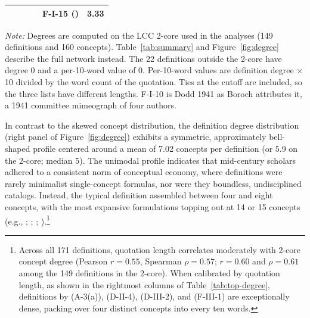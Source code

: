 \documentclass[11pt]{article}
\begin{document}
\begin{table}[t]
\begin{tabular}{lrlrlr}
 & & & & F-I-15 (\citealt{carr1945}) & 3.33 \\
\bottomrule
\end{tabular}
\par\smallskip
\begin{minipage}{0.95\linewidth}
\small
\emph{Note:} Degrees are computed on the LCC 2-core used in the analyses (149 definitions and 160 concepts). Table~\ref{tab:summary} and Figure~\ref{fig:degree} describe the full network instead. The 22 definitions outside the 2-core have degree 0 and a per-10-word value of 0. Per-10-word values are definition degree $\times$ 10 divided by the word count of the quotation. Ties at the cutoff are included, so the three lists have different lengths. F-I-10 is Dodd 1941 as Boroch attributes it, a 1941 committee mimeograph of four authors.
\end{minipage}
\end{table}

In contrast to the skewed concept distribution, the definition degree distribution (right panel of Figure~\ref{fig:degree}) exhibits a symmetric, approximately bell-shaped profile centered around a mean of 7.02 concepts per definition (or 5.9 on the 2-core; median 5). The unimodal profile indicates that mid-century scholars adhered to a consistent norm of conceptual economy, where definitions were rarely minimalist single-concept formulas, nor were they boundless, undisciplined catalogs. Instead, the typical definition assembled between four and eight concepts, with the most expansive formulations topping out at 14 or 15 concepts (e.g., \citealt{reuter1939}; \citealt{taylor1948}; \citealt{hiller1933}; \citealt{gillin1942}).\footnote{Across all 171 definitions, quotation length correlates moderately with 2-core concept degree (Pearson $r = 0.55$, Spearman $\rho = 0.57$; $r = 0.60$ and $\rho = 0.61$ among the 149 definitions in the 2-core). When calibrated by quotation length, as shown in the rightmost columns of Table~\ref{tab:top-degree}, definitions by \citealt{dixon1928} (A-3(a)), \citealt{kluckhohn1942} (D-II-4), \citealt{young1934} (D-III-2), and \citealt{bain1942} (F-III-1) are exceptionally dense, packing over four distinct concepts into every ten words.}
\end{document}
